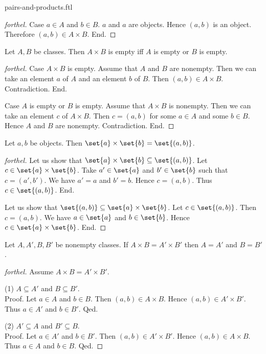 \documentclass{naproche-library}
\begin{document}
\begin{smodule}{pairs-and-products.ftl}
\begin{proof}[forthel]
    Case $a \in A$ and $b \in B$.
      $a$ and $a$ are objects.
      Hence $(a, b)$ is an object.
      Therefore $(a, b) \in A \times B$.
    End.
  \end{proof}

  \begin{proposition}[forthel,id=FOUNDATIONS_04_2198552029691904]
    Let $A, B$ be classes.
    Then $A \times B$ is empty iff $A$ is empty or $B$ is empty.
  \end{proposition}
  \begin{proof}[forthel]
    Case $A \times B$ is empty.
      Assume that $A$ and $B$ are nonempty.
      Then we can take an element $a$ of $A$ and an element $b$ of $B$.
      Then $(a, b) \in A \times B$.
      Contradiction.
    End.

    Case $A$ is empty or $B$ is empty.
      Assume that $A \times B$ is nonempty.
      Then we can take an element $c$ of $A \times B$.
      Then $c = (a, b)$ for some $a \in A$ and some $b \in B$.
      Hence $A$ and $B$ are nonempty.
      Contradiction.
    End.
  \end{proof}

  \begin{proposition}[forthel,id=FOUNDATIONS_04_7971087096741888]
    Let $a, b$ be objects.
    Then $\set{a} \times \set{b} = \set{(a, b)}$.
  \end{proposition}
  \begin{proof}[forthel]
    Let us show that $\set{a} \times \set{b} \subseteq \set{(a, b)}$.
      Let $c \in \set{a} \times \set{b}$.
      Take $a' \in \set{a}$ and $b' \in \set{b}$ such that $c = (a', b')$.
      We have $a' = a$ and $b' = b$.
      Hence $c = (a, b)$.
      Thus $c \in \set{(a, b)}$.
    End.

    Let us show that $\set{(a, b)} \subseteq \set{a} \times \set{b}$.
      Let $c \in \set{(a, b)}$.
      Then $c = (a, b)$.
      We have $a \in \set{a}$ and $b \in \set{b}$.
      Hence $c \in \set{a} \times \set{b}$.
    End.
  \end{proof}

  \begin{proposition}[forthel,id=FOUNDATIONS_04_7456594440749056]
    Let $A, A', B, B'$ be nonempty classes.
    If $A \times B = A' \times B'$ then $A = A'$ and $B = B'$.
  \end{proposition}
  \begin{proof}[forthel]
    Assume $A \times B = A' \times B'$.

    (1) $A \subseteq A'$ and $B \subseteq B'$. \\
    Proof.
      Let $a \in A$ and $b \in B$.
      Then $(a,b) \in A \times B$.
      Hence $(a,b) \in A' \times B'$.
      Thus $a \in A'$ and $b \in B'$.
    Qed.

    (2) $A' \subseteq A$ and $B' \subseteq B$. \\
    Proof.
      Let $a \in A'$ and $b \in B'$.
      Then $(a,b) \in A' \times B'$.
      Hence $(a,b) \in A \times B$.
      Thus $a \in A$ and $b \in B$.
    Qed.
  \end{proof}
\end{smodule}
\end{document}
